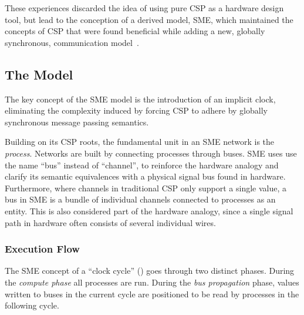 These experiences discarded the idea of using pure CSP as a hardware design
tool, but lead to the conception of a derived model, SME, which maintained the
concepts of CSP that were found beneficial while adding a new, globally
synchronous, communication model~\cite{vinter2014synchronous}.

\subsection{The Model}
The key concept of the SME model is the introduction of an implicit clock,
eliminating the complexity induced by forcing CSP to adhere by globally
synchronous message passing semantics.



Building on its CSP roots, the fundamental unit in an SME network is the
{\itshape process}.  Networks are built by connecting processes through buses.
SME uses use the name ``bus'' instead of ``channel'', to reinforce the hardware
analogy and clarify its semantic equivalences with a physical signal bus found
in hardware. Furthermore, where channels in traditional CSP only support a
single value, a bus in SME is a bundle of individual channels connected to
processes as an entity.  This is also considered part of the hardware analogy,
since a single signal path in hardware often consists of several individual
wires.

\subsubsection{Execution Flow}
The SME concept of a ``clock cycle'' () goes through two
distinct phases. During the {\itshape compute phase} all processes are
run. During the {\itshape bus propagation} phase, values written to buses in the
current cycle are positioned to be read by processes in the following cycle.

